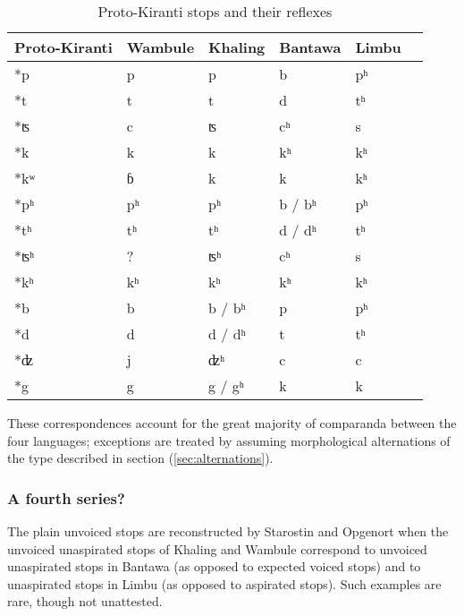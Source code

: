 \documentclass[oldfontcommands,oneside,a4paper,11pt]{article}
\newcommand{\ipa}[1]{{\phon \mbox{#1}}} %
\begin{document}
\begin{table}[H]
\caption{Proto-Kiranti stops and their reflexes} \centering \label{tab:stops}
\begin{tabular}{llllll}
\toprule
Proto-Kiranti & Wambule & Khaling & Bantawa & Limbu \\
\midrule
\ipa{*p} & \ipa{p} & \ipa{p} & \ipa{b} & \ipa{pʰ}  \\
\ipa{*t} & \ipa{t} & \ipa{t} & \ipa{d} & \ipa{tʰ}  \\
\ipa{*ʦ} & \ipa{c} & \ipa{ʦ} & \ipa{cʰ} & \ipa{s}  \\
\ipa{*k} & \ipa{k} & \ipa{k} & \ipa{kʰ} & \ipa{kʰ}  \\
\midrule
\ipa{*kʷ} & \ipa{ɓ} & \ipa{k} & \ipa{k} & \ipa{kʰ}  \\
\midrule
\ipa{*pʰ} & \ipa{pʰ} & \ipa{pʰ} & \ipa{b} / \ipa{bʰ}  & \ipa{pʰ}  \\
\ipa{*tʰ} & \ipa{tʰ} & \ipa{tʰ} & \ipa{d} / \ipa{dʰ} & \ipa{tʰ}  \\
\ipa{*ʦʰ} & ? & \ipa{ʦʰ} & \ipa{cʰ} & \ipa{s}  \\
\ipa{*kʰ} & \ipa{kʰ} & \ipa{kʰ} & \ipa{kʰ} & \ipa{kʰ}  \\
\midrule
\ipa{*b} & \ipa{b} &\ipa{b} / \ipa{bʰ}  & \ipa{p} & \ipa{pʰ}  \\
\ipa{*d} & \ipa{d} & \ipa{d} / \ipa{dʰ}  & \ipa{t} & \ipa{tʰ}  \\
\ipa{*ʣ} & \ipa{j} & \ipa{ʣʰ} & \ipa{c} & \ipa{c}  \\
\ipa{*g} & \ipa{g} & \ipa{g} / \ipa{gʰ}  & \ipa{k} & \ipa{k}  \\
\bottomrule
\end{tabular}
\end{table}

These correspondences account for the great majority of comparanda between the four languages; exceptions are treated by assuming  morphological alternations of the type described in section (\ref{sec:alternations}).

\subsubsection{A fourth series?} \label{sec:fourth}
The plain unvoiced stops are reconstructed by Starostin and Opgenort  when the unvoiced unaspirated stops of Khaling and Wambule correspond to unvoiced unaspirated stops in Bantawa (as opposed to expected voiced stops) and to unaspirated stops in Limbu (as opposed to aspirated stops). Such examples are rare, though not unattested. 
\end{document}
